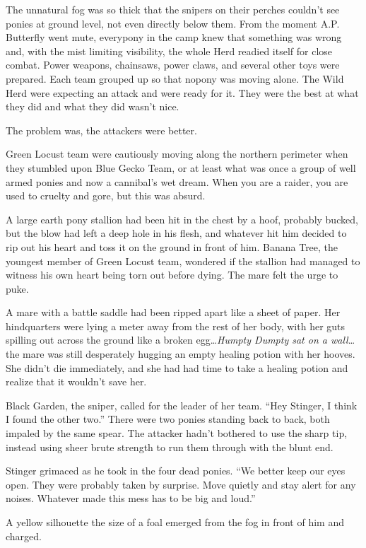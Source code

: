 The unnatural fog was so thick that the snipers on their perches couldn't see ponies at ground level, not even directly below them. From the moment A.P. Butterfly went mute, everypony in the camp knew that something was wrong and, with the mist limiting visibility, the whole Herd readied itself for close combat. Power weapons, chainsaws, power claws, and several other toys were prepared. Each team grouped up so that nopony was moving alone. The Wild Herd were expecting an attack and were ready for it. They were the best at what they did and what they did wasn't nice.

The problem was, the attackers were better.

Green Locust team were cautiously moving along the northern perimeter when they stumbled upon Blue Gecko Team, or at least what was once a group of well armed ponies and now a cannibal's wet dream. When you are a raider, you are used to cruelty and gore, but this was absurd.

A large earth pony stallion had been hit in the chest by a hoof, probably bucked, but the blow had left a deep hole in his flesh, and whatever hit him decided to rip out his heart and toss it on the ground in front of him. Banana Tree, the youngest member of Green Locust team, wondered if the stallion had managed to witness his own heart being torn out before dying. The mare felt the urge to puke.

A mare with a battle saddle had been ripped apart like a sheet of paper. Her hindquarters were lying a meter away from the rest of her body, with her guts spilling out across the ground like a broken egg\dots \emph{Humpty Dumpty sat on a wall}\dots the mare was still desperately hugging an empty healing potion with her hooves. She didn't die immediately, and she had had time to take a healing potion and realize that it wouldn't save her.

Black Garden, the sniper, called for the leader of her team. ``Hey Stinger, I think I found the other two.'' There were two ponies standing back to back, both impaled by the same spear. The attacker hadn't bothered to use the sharp tip, instead using sheer brute strength to run them through with the blunt end.

Stinger grimaced as he took in the four dead ponies. ``We better keep our eyes open. They were probably taken by surprise. Move quietly and stay alert for any noises. Whatever made this mess has to be big and loud.''

A yellow silhouette the size of a foal emerged from the fog in front of him and charged.



